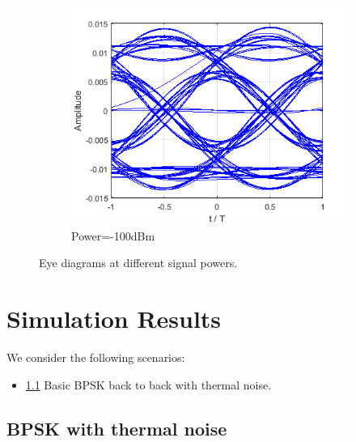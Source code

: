 \documentclass[a4paper]{article}
\begin{document}
\begin{figure}[H]
\begin{subfigure}{.3\linewidth}
\includegraphics[width=\linewidth]{eyeopen.png}
\caption{Power=-100dBm}
\end{subfigure}
\caption{Eye diagrams at different signal powers.}
\end{figure}


\section{Simulation Results}

We consider the following scenarios:
\begin{itemize}
\item \ref{subsec:scenario1} Basic BPSK back to back with  thermal noise.
\end{itemize}

\subsection{BPSK with thermal noise}\label{subsec:scenario1}
\end{document}
